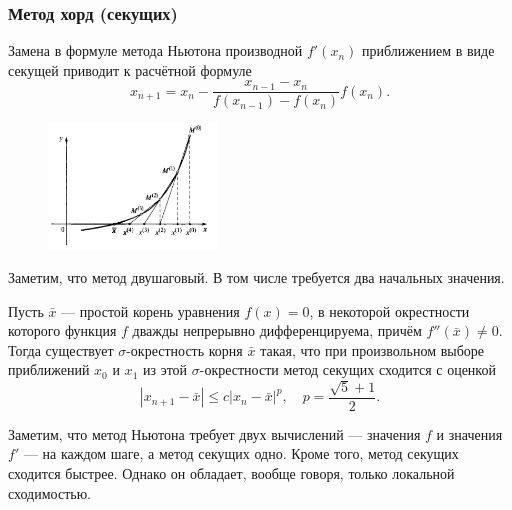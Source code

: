 \subsubsection{Метод хорд (секущих)}
Замена в формуле метода Ньютона производной $ f'(x_n) $ приближением в виде
секущей приводит к
расчётной формуле
\[
  x_{n+1} = x_n - \frac{x_{n-1} - x_n}{f(x_{n-1}) - f(x_n)} f(x_n).
\]
\begin{figure}[h]
  \centering
  \includegraphics[width=0.4\textwidth]{img/chord.png}
  \label{fig:chord}
\end{figure}
Заметим, что метод двушаговый. В том числе требуется два начальных значения.
\begin{theorem}
  Пусть $ \bar x $ --- простой корень уравнения $ f(x) = 0 $, в некоторой
  окрестности которого функция $ f $ дважды непрерывно дифференцируема, причём
  $ f''(\bar x) \neq 0 $. Тогда существует $ \sigma $-окрестность корня $ \bar x
  $ такая, что при произвольном выборе приближений $ x_0 $ и $ x_1 $ из этой $
  \sigma $-окрестности метод секущих сходится с оценкой  
  \[
    |x_{n+1} - \bar x| \leqslant c |x_n - \bar x|^p, 
    \quad p = \frac{\sqrt 5 + 1}{2}.
  \]
\end{theorem}

Заметим, что метод Ньютона требует двух вычислений --- значения $ f $ и значения
$ f' $ --- на каждом шаге, а метод секущих одно. Кроме того, метод секущих
сходится быстрее. Однако он обладает, вообще говоря, только локальной
сходимостью.


